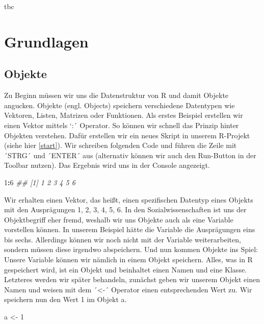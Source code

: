 \documentclass[
]{book}
\newenvironment{Shaded}{\begin{snugshade}}{\end{snugshade}}
\newcommand{\CommentTok}[1]{\textcolor[rgb]{0.56,0.35,0.01}{\textit{#1}}}
\newcommand{\DecValTok}[1]{\textcolor[rgb]{0.00,0.00,0.81}{#1}}
\newcommand{\NormalTok}[1]{#1}
\newcommand{\OperatorTok}[1]{\textcolor[rgb]{0.81,0.36,0.00}{\textbf{#1}}}
\newcommand{\StringTok}[1]{\textcolor[rgb]{0.31,0.60,0.02}{#1}}
\begin{document}
tbc

\hypertarget{grundlagen}{%
\chapter{Grundlagen}\label{grundlagen}}

\hypertarget{objekte}{%
\section{Objekte}\label{objekte}}

Zu Beginn müssen wir uns die Datenstruktur von R und damit Objekte angucken. Objekte (engl. Objects) speichern verschiedene Datentypen wie Vektoren, Listen, Matrizen oder Funktionen. Als erstes Beispiel erstellen wir einen Vektor mittels `:´ Operator. So können wir schnell das Prinzip hinter Objekten verstehen. Dafür erstellen wir ein neues Skript in unserem R-Projekt (siehe hier \ref{start}). Wir schreiben folgenden Code und führen die Zeile mit ´STRG´ und ´ENTER´ aus (alternativ können wir auch den Run-Button in der Toolbar nutzen). Das Ergebnis wird uns in der Console angezeigt.

\begin{Shaded}
\begin{Highlighting}[]
\DecValTok{1}\OperatorTok{:}\DecValTok{6}
\CommentTok{## [1] 1 2 3 4 5 6}
\end{Highlighting}
\end{Shaded}

Wir erhalten einen Vektor, das heißt, einen spezifischen Datentyp eines Objekts mit den Ausprägungen 1, 2, 3, 4, 5, 6. In den Sozialwissenschaften ist uns der Objektbegriff eher fremd, weshalb wir uns Objekte auch als eine Variable vorstellen können. In unserem Beispiel hätte die Variable die Ausprägungen eins bis sechs. Allerdings können wir noch nicht mit der Variable weiterarbeiten, sondern müssen diese irgendwo abspeichern. Und nun kommen Objekte ins Spiel: Unsere Variable können wir nämlich in einem Objekt speichern. Alles, was in R gespeichert wird, ist ein Objekt und beinhaltet einen Namen und eine Klasse. Letzteres werden wir später behandeln, zunächst geben wir unserem Objekt einen Namen und weisen mit dem ´\textless-´ Operator einen entsprechenden Wert zu. Wir speichern nun den Wert 1 im Objekt a.

\begin{Shaded}
\begin{Highlighting}[]
\NormalTok{a <-}\StringTok{ }\DecValTok{1}
\end{Highlighting}
\end{Shaded}
\end{document}
